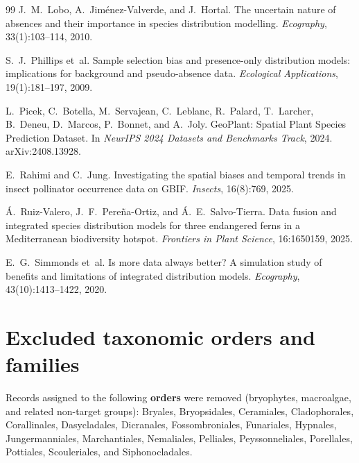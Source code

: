 \documentclass[11pt,letterpaper]{article}
\begin{document}
\begin{thebibliography}{99}
J.~M.~Lobo, A.~Jim\'enez-Valverde, and J.~Hortal.
\newblock The uncertain nature of absences and their importance in species distribution modelling.
\newblock \emph{Ecography}, 33(1):103--114, 2010.

S.~J.~Phillips et~al.
\newblock Sample selection bias and presence-only distribution models: implications for background and pseudo-absence data.
\newblock \emph{Ecological Applications}, 19(1):181--197, 2009.

L.~Picek, C.~Botella, M.~Servajean, C.~Leblanc, R.~Palard, T.~Larcher, B.~Deneu, D.~Marcos, P.~Bonnet, and A.~Joly.
\newblock GeoPlant: Spatial Plant Species Prediction Dataset.
\newblock In \emph{NeurIPS 2024 Datasets and Benchmarks Track}, 2024.
\newblock arXiv:2408.13928.

E.~Rahimi and C.~Jung.
\newblock Investigating the spatial biases and temporal trends in insect pollinator occurrence data on GBIF.
\newblock \emph{Insects}, 16(8):769, 2025.

\'A.~Ruiz-Valero, J.~F.~Pere\~na-Ortiz, and \'A.~E.~Salvo-Tierra.
\newblock Data fusion and integrated species distribution models for three endangered ferns in a Mediterranean biodiversity hotspot.
\newblock \emph{Frontiers in Plant Science}, 16:1650159, 2025.

E.~G.~Simmonds et~al.
\newblock Is more data always better? A simulation study of benefits and limitations of integrated distribution models.
\newblock \emph{Ecography}, 43(10):1413--1422, 2020.

\end{thebibliography}


\appendix

\section{Excluded taxonomic orders and families}
\label{app:taxfilters}

Records assigned to the following \textbf{orders} were removed (bryophytes, macroalgae, and related non-target groups):
Bryales, Bryopsidales, Ceramiales, Cladophorales, Corallinales, Dasycladales, Dicranales, Fossombroniales, Funariales, Hypnales, Jungermanniales, Marchantiales, Nemaliales, Pelliales, Peyssonneliales, Porellales, Pottiales, Scouleriales, and Siphonocladales.
\end{document}
